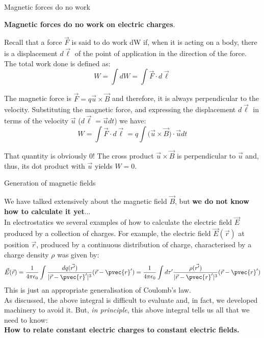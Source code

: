 \begin{frame}{Magnetic forces do no work}

{\bf Magnetic forces do no work on electric charges}.

\vspace{0.2cm}

Recall that a force $\vec{F}$ is said to do work dW if, when it is acting on a body, there is a displacement $d\vec{\ell}$
of the point of application in the direction of the force. The total work done is defined as:
\begin{equation*}
  W = \int dW = \int \vec{F} \cdot d\vec{\ell}
\end{equation*}

\vspace{0.1cm}

The magnetic force is  $\vec{F} = q \vec{u} \times \vec{B}$
and therefore, it is always perpendicular to the velocity.
Substituting the magnetic force, and expressing the displacement  $d\vec{\ell}$
in terms of the velocity $\vec{u}$ ($d\vec{\ell} = \vec{u} dt$) we have:
\begin{equation*}
  W = \int \vec{F} \cdot d\vec{\ell} = q \int \Big( \vec{u} \times \vec{B} \Big) \cdot \vec{u} dt
\end{equation*}

That quantity is obviously 0! The cross product $\vec{u} \times \vec{B}$ is perpendicular to $\vec{u}$ and,
thus, its dot product with $\vec{u}$ yields $W = 0$.
\end{frame}


%
%
%

\begin{frame}{Generation of magnetic fields}

We have talked extensively about the magnetic field $\vec{B}$,
but {\bf we do not know how to calculate it yet}...\\
\vspace{0.2cm}
In electrostatics we several examples of how to calculate the
electric field $\vec{E}$ produced by a collection of charges.
For example, the electric field $\vec{E}(\vec{r})$ at position $\vec{r}$,
produced by a continuous distribution of charge, characterised by a charge density $\rho$
was given by:
\begin{equation*}
  \vec{E}(\vec{r}) =
  \frac{1}{4\pi\epsilon_0} \int
  \frac{dq(\vec{r^{\prime}})}{|\vec{r}-\pvec{r}'|^{3}} (\vec{r}-\pvec{r}') =
  \frac{1}{4\pi\epsilon_0} \int d\tau^{\prime}
  \frac{\rho(\vec{r^{\prime}})}{|\vec{r}-\pvec{r}'|^{3}} (\vec{r}-\pvec{r}')
\end{equation*}
This is just an appropriate generalisation of Coulomb's law.\\
\vspace{0.2cm}
As discussed, the above integral is difficult to evaluate and, in fact, we developed machinery to avoid it.
But, {\em in principle}, this above integral tells us all that we need to know:\\
\vspace{0.2cm}
{\bf How to relate constant electric charges to constant electric fields.}

\end{frame}


